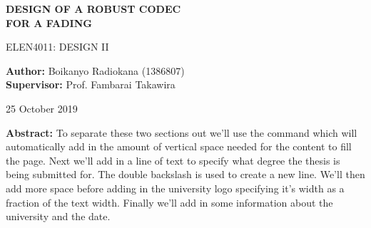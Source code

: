 \begin{titlepage}
\begin{center}
\textbf{\Large DESIGN OF A ROBUST CODEC \\ \vspace{0.2cm} FOR A FADING}

\vspace{0.5cm}
         ELEN4011: DESIGN II
 
       \vspace{1.5cm}
 
       \textbf{Author:} Boikanyo Radiokana (1386807) \\
       \vspace{1.5cm}
       \textbf{Supervisor:} Prof. Fambarai Takawira
       \vspace{1cm}
       
       25 October 2019
       \vfill

\begin{adjustwidth}{5mm}{}
\textbf{Abstract:} To separate these two sections out we'll use the command which will automatically add in the amount of vertical space needed for the content to fill the page. Next we'll add in a line of text to specify what degree the thesis is being submitted for. The double backslash is used to create a new line. We'll then add more space before adding in the university logo specifying it's width as a fraction of the text width. Finally we'll add in some information about the university and the date.
\end{adjustwidth}

       

       
 
   \end{center}
\end{titlepage}